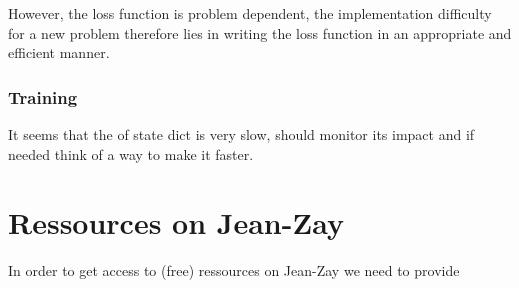  However, the loss function is problem dependent, the implementation difficulty for a new problem therefore lies in writing the loss function in an appropriate and efficient manner.

\subsubsection{Training}

It seems that the  of state dict is very slow, should monitor its impact and if needed think of a way to make it faster.


 \section{Ressources on Jean-Zay}
\label{sec:JZ}
 In order to get access to (free) ressources on Jean-Zay we need to provide

